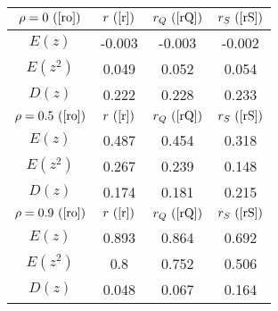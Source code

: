 \begin{tabular}{|c|c|c|c|}
\hline
$\rho = 0~(\ref{ro})$ & $r ~(\ref{r})$ & $r_Q ~(\ref{rQ})$ & $r_S ~(\ref{rS})$\\
\hline
$E(z)$ & -0.003 & -0.003 & -0.002\\
\hline
$E(z^2)$ & 0.049 & 0.052 & 0.054\\
\hline
$D(z)$ & 0.222 & 0.228 & 0.233\\
\hline
$\rho = 0.5~(\ref{ro})$ & $r ~(\ref{r})$ & $r_Q ~(\ref{rQ})$ & $r_S ~(\ref{rS})$\\
\hline
$E(z)$ & 0.487 & 0.454 & 0.318\\
\hline
$E(z^2)$ & 0.267 & 0.239 & 0.148\\
\hline
$D(z)$ & 0.174 & 0.181 & 0.215\\
\hline
$\rho = 0.9~(\ref{ro})$ & $r ~(\ref{r})$ & $r_Q ~(\ref{rQ})$ & $r_S ~(\ref{rS})$\\
\hline
$E(z)$ & 0.893 & 0.864 & 0.692\\
\hline
$E(z^2)$ & 0.8 & 0.752 & 0.506\\
\hline
$D(z)$ & 0.048 & 0.067 & 0.164\\
\hline
\end{tabular}